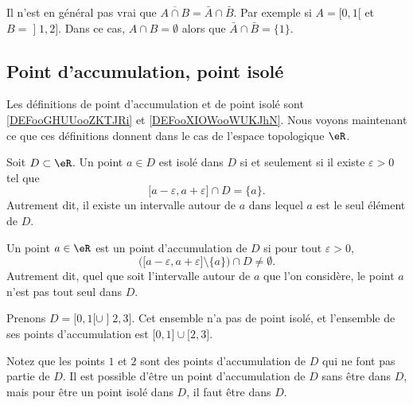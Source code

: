 \begin{example} \label{ExBFLooUNyvbw}
    Il n'est en général pas vrai que \( \overline{ A\cap B }=\bar A\cap \bar B\). Par exemple si \( A=\mathopen[ 0 , 1 [\) et \( B=\mathopen] 1 , 2 \mathclose]\). Dans ce cas, \( A\cap B=\emptyset\) alors que \( \bar A\cap\bar B=\{ 1 \}\).
\end{example}

\subsection{Point d'accumulation, point isolé}

Les définitions de point d'accumulation et de point isolé sont \ref{DEFooGHUUooZKTJRi} et \ref{DEFooXIOWooWUKJhN}. Nous voyons maintenant ce que ces définitions donnent dans le cas de l'espace topologique \( \eR\).

\begin{lemma}
    Soit $D\subset\eR$. Un point $a\in D$ est isolé dans $D$ si et seulement si il existe $\varepsilon>0$ tel que
    \begin{equation}
        \mathopen[ a-\varepsilon , a+\varepsilon \mathclose]\cap D=\{ a \}.
    \end{equation}
    Autrement dit, il existe un intervalle autour de $a$ dans lequel $a$ est le seul élément de $D$.
\end{lemma}

\begin{lemma}
    Un point $a\in \eR$ est un point d'accumulation de $D$ si pour tout $\varepsilon>0$,
    \begin{equation}
        \Big( \mathopen[ a-\varepsilon , a+\varepsilon \mathclose]\setminus\{ a \} \Big)\cap D\neq\emptyset.
    \end{equation}
    Autrement dit, quel que soit l'intervalle autour de  $a$ que l'on considère, le point $a$ n'est pas tout seul dans $D$.
\end{lemma}

\begin{example}
	Prenons $D=\mathopen[ 0 , 1 [\cup\mathopen] 2 , 3 \mathclose]$. Cet ensemble n'a pas de point isolé, et l'ensemble de ses points d'accumulation est $\mathopen[ 0 , 1 \mathclose]\cup\mathopen[ 2,3  \mathclose]$.

	Notez que les points $1$ et $2$ sont des points d'accumulation de $D$ qui ne font pas partie de $D$. Il est possible d'être un point d'accumulation de $D$ sans être dans $D$, mais pour être un point isolé dans $D$, il faut être dans $D$.
\end{example}

